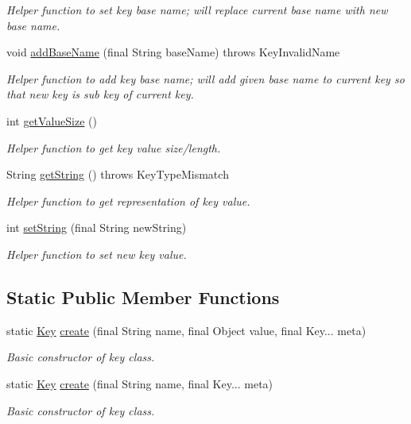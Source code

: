 \begin{DoxyCompactItemize}
\begin{DoxyCompactList}\small\item\em Helper function to set key base name; will replace current base name with new base name. \end{DoxyCompactList}\item 
void \hyperlink{classorg_1_1libelektra_1_1Key_a07a939d44265c7b017104f3f37e9ca16}{add\+Base\+Name} (final String base\+Name)  throws Key\+Invalid\+Name 
\begin{DoxyCompactList}\small\item\em Helper function to add key base name; will add given base name to current key so that new key is sub key of current key. \end{DoxyCompactList}\item 
int \hyperlink{classorg_1_1libelektra_1_1Key_aeb1c3e899a17778c8511a08ee0472e43}{get\+Value\+Size} ()
\begin{DoxyCompactList}\small\item\em Helper function to get key value size/length. \end{DoxyCompactList}\item 
String \hyperlink{classorg_1_1libelektra_1_1Key_a3464485c19d49b6763f6c831cf5ed06c}{get\+String} ()  throws Key\+Type\+Mismatch 
\begin{DoxyCompactList}\small\item\em Helper function to get representation of key value. \end{DoxyCompactList}\item 
int \hyperlink{classorg_1_1libelektra_1_1Key_a5ccfaddf110c47c83686655a694ee76d}{set\+String} (final String new\+String)
\begin{DoxyCompactList}\small\item\em Helper function to set new key value. \end{DoxyCompactList}\end{DoxyCompactItemize}
\subsection*{Static Public Member Functions}
\begin{DoxyCompactItemize}
\item 
static \hyperlink{classorg_1_1libelektra_1_1Key}{Key} \hyperlink{classorg_1_1libelektra_1_1Key_a785f6b8e937d51575a4acc2ebc8f19a2}{create} (final String name, final Object value, final Key... meta)
\begin{DoxyCompactList}\small\item\em Basic constructor of key class. \end{DoxyCompactList}\item 
static \hyperlink{classorg_1_1libelektra_1_1Key}{Key} \hyperlink{classorg_1_1libelektra_1_1Key_a77ab77c48bcb237724581d914abbd7fe}{create} (final String name, final Key... meta)
\begin{DoxyCompactList}\small\item\em Basic constructor of key class. \end{DoxyCompactList}\end{DoxyCompactItemize}
